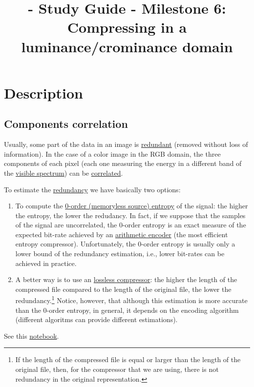 
\title{\SM{} - Study Guide - Milestone 6: Compressing in a luminance/crominance domain}

\maketitle

\tableofcontents

\section{Description}

\subsection{Components correlation}
Usually, some part of the data in an image is
\href{https://en.wikipedia.org/wiki/Data_redundancy}{redundant}
(removed without loss of information). In the case of a color image in
the RGB domain, the three components of each pixel (each one measuring
the energy in a different band of the
\href{https://en.wikipedia.org/wiki/Visible_spectrum}{visible
  spectrum}) can be
\href{https://en.wikipedia.org/wiki/Correlation_and_dependence}{correlated}.

To estimate the
\href{https://en.wikipedia.org/wiki/Redundancy_(information_theory)}{redundancy}
we have basically two options:
\begin{enumerate}
\item To compute the
  \href{https://en.wikipedia.org/wiki/Entropy_(information_theory)}{0-order
    (memoryless source) entropy} of the signal: the higher the
  entropy, the lower the redudancy. In fact, if we suppose that the
  samples of the signal are uncorrelated, the 0-order entropy is an
  exact measure of the expected bit-rate achieved by an
  \href{https://en.wikipedia.org/wiki/Arithmetic_coding}{arithmetic
    encoder} (the most efficient entropy compressor). Unfortunately,
  the 0-order entropy is usually only a lower bound of the redundancy
  estimation, i.e., lower bit-rates can be achieved in practice.
\item A better way is to use an
  \href{https://en.wikipedia.org/wiki/Data_compression}{lossless
    compressor}: the higher the length of the compressed file compared
  to the length of the original file, the lower the
  redundancy.\footnote{If the length of the compressed file is equal or
  larger than the length of the original file, then, for the compressor
  that we are using, there is not redundancy in the original
  representation.} Notice, however, that although this estimation is
  more accurate than the 0-order entropy, in general, it depends on the
  encoding algorithm (different algoritms can provide different
  estimations).
\end{enumerate}
See this
\href{https://github.com/Sistemas-Multimedia/Sistemas-Multimedia.github.io/blob/master/milestones/06-YUV_compression/color_redundancy.ipynb}{notebook}.

